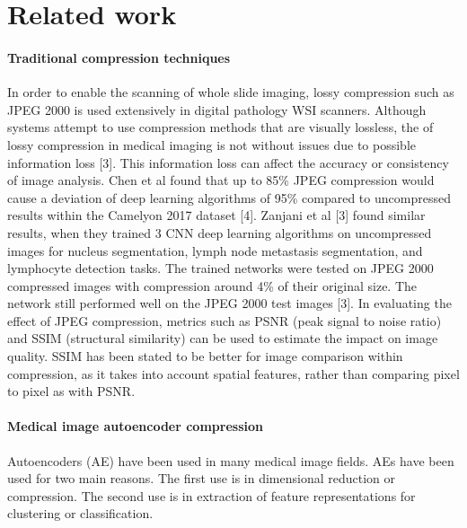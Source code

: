 \documentclass[review]{elsarticle}
\begin{document}
\section{Related work}
\paragraph{Traditional compression techniques}
In order to enable the scanning of whole slide imaging, lossy compression such as JPEG 2000 is used extensively in digital pathology WSI scanners. Although systems attempt to use compression methods that are visually lossless, the of lossy compression in medical imaging is not without issues due to possible information loss [3]. This information loss can affect the accuracy or consistency of image analysis. Chen et al found that up to 85\% JPEG compression would cause a deviation of deep learning algorithms of 95\% compared to uncompressed results within the Camelyon 2017 dataset [4]. Zanjani et al [3] found similar results, when they trained 3 CNN deep learning algorithms on uncompressed images for nucleus segmentation, lymph node metastasis segmentation, and lymphocyte detection tasks. The trained networks were tested on JPEG 2000 compressed images with compression around 4\% of their original size. The network still performed well on the JPEG 2000 test images [3].
In evaluating the effect of JPEG compression, metrics such as PSNR (peak signal to noise ratio) and SSIM (structural similarity) can be used to estimate the impact on image quality. SSIM has been stated to be better for image comparison within compression, as it takes into account spatial features, rather than comparing pixel to pixel as with PSNR.

\paragraph{Medical image autoencoder compression} Autoencoders (AE) have been used in many medical image fields. AEs have been used for two main reasons. The first use is in dimensional reduction or compression. The second use is in extraction of feature representations for clustering or classification.
\end{document}
